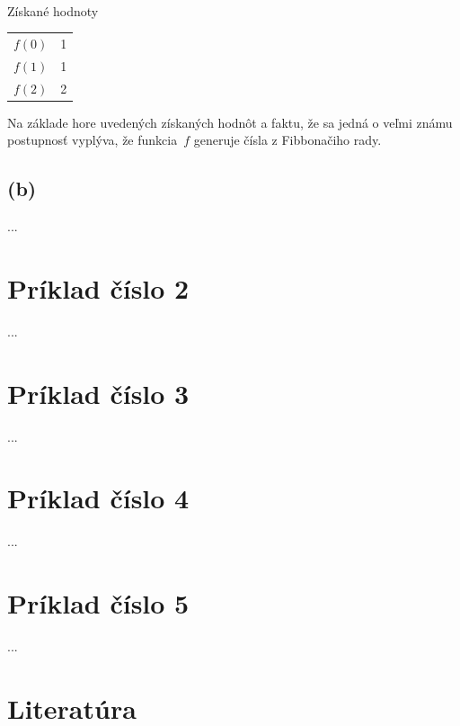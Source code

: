 \documentclass[11pt,a4paper]{article}
\begin{document}
\hfill\\[-1em]

Získané hodnoty

\begin{center}
  \begin{tabular}{r@{ $=$ }l}
    $f(0)$ & 1 \\
    $f(1)$ & 1 \\
    $f(2)$ & 2 \\
  \end{tabular}
\end{center}

Na základe hore uvedených získaných hodnôt a faktu, že sa jedná o veľmi známu postupnosť vyplýva, že funkcia~$f$ generuje čísla z Fibbonačiho rady.

\subsection{(b)}

...

\newpage
\section{Príklad číslo 2}

...

\newpage
\section{Príklad číslo 3}

...

\newpage
\section{Príklad číslo 4}

...

\newpage
\section{Príklad číslo 5}

...\cite{TIN}

\newpage
\section{Literatúra}

\begin{flushleft}
    
\end{flushleft}
\end{document}
